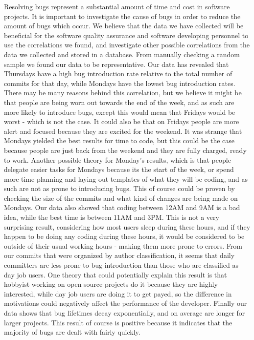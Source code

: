 \documentclass[preprint, 11pt]{sigplanconf}
\begin{document}
Resolving bugs represent a substantial amount of time and cost in
software projects. It is important to investigate the cause of bugs in
order to reduce the amount of bugs which occur. We believe that the
data we have collected will be beneficial for the software quality
assurance and software developing personnel to use the correlations we
found, and investigate other possible correlations from the data we
collected and stored in a database. From manually checking a random
sample we found our data to be representative. Our data has
revealed that Thursdays have a high bug introduction rate relative to
the total number of commits for that day, while Mondays have the
lowest bug introduction rates. There may be many reasons behind this
correlation, but we believe it might be that people are being worn out towards the
end of the week, and as such are more likely to introduce bugs, except
this would mean that Fridays would be worst - which is not the
case. It could also be that on Fridays people are more alert and focused
because they are excited for the weekend. It was strange that Mondays
yielded the best results for time to code, but this could be the case
because people are just back from the weekend and they are fully
charged, ready to work. Another possible theory for Monday's results,
which is that people delegate easier tasks for Mondays because its the
start of the week, or spend more time planning and laying out
templates of what they will be coding, and as such are not as prone to
introducing bugs. This of course could be proven by checking the size of
the commits and what kind of changes are being made on Mondays. Our
data also showed that coding between 12AM and 9AM is a bad idea, while
the best time is between 11AM and 3PM. This is not a very surprising
result, considering how most users sleep during these hours, and if
they happen to be doing any coding during these hours, it would be
considered to be outside of their usual working hours - making them
more prone to errors.  From our commits that were organized by author
classification, it seems that daily committers are less prone to bug
introduction than those who are classified as day job users. One
theory that could potentially explain this result is that hobbyist
working on open source projects do it because they are highly
interested, while day job users are doing it to get payed, so the
difference in motivations could negatively affect the performance
of the developer. Finally our data shows that bug lifetimes decay
exponentially, and on average are longer for larger projects. This
result of course is positive because it indicates that the majority of
bugs are dealt with fairly quickly.




\nocite{*}


\end{document}
